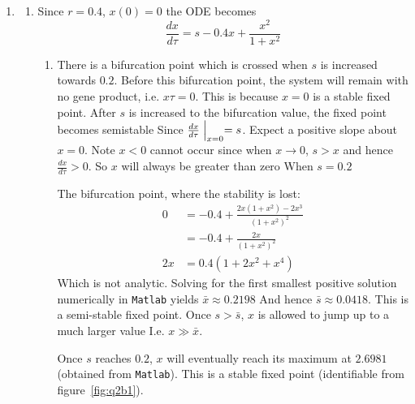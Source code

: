 \documentclass{/home/janmebows/Documents/LatexTemplates/myassignment}
\begin{document}
\begin{enumerate}
    \item 
    \begin{enumerate}
        \item Since $r=0.4$, $x(0)=0$ the ODE becomes
        \[\frac{dx}{d\tau} = s - 0.4 x + \frac{x^2}{1+x^2}\]
    \begin{enumerate}
        \item %
        There is a bifurcation point which is crossed when $s$ is increased towards $0.2$.
        Before this bifurcation point, the system will remain with no gene product, i.e. $x\tau =0$. This is because $x=0$ is a stable fixed point. After $s$ is increased to the bifurcation value, the fixed point becomes semistable 
        Since $\frac{dx}{d\tau}\Bigm|_{x=0} = s$. Expect a positive slope about $x=0$. 
        Note $x < 0$ cannot occur since when $x\to 0$, $ s > x$ and hence $\frac{dx}{d\tau} > 0$. So $x$ will always be greater than zero 
        When $s = 0.2$ 

        The bifurcation point, where the stability is lost:
        \begin{align*}
            0&=-0.4 + \frac{2x(1+x^2) -2x^3}{(1+x^2)^2} \\
            &=-0.4 + \frac{2x}{(1+x^2)^2} \\
            2x &= 0.4(1+2x^2 +x^4)
        \end{align*}
        Which is not analytic.
        Solving for the first smallest positive solution numerically in \verb|Matlab| yields $\bar{x} \approx 0.2198$ And hence $\bar{s} \approx 0.0418$. This is a semi-stable fixed point.
        Once $s>\bar{s}$, $x$ is allowed to jump up to a much larger value I.e. $x \gg \bar{x}$.

        Once $s$ reaches $0.2$, $x$ will eventually reach its maximum at $2.6981$ (obtained from \verb|Matlab|). This is a stable fixed point (identifiable from figure~\ref{fig:q2b1}). 



\end{enumerate}
\end{enumerate}
\end{enumerate}
\end{document}
